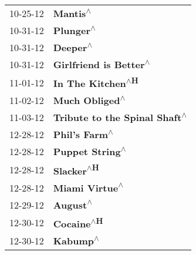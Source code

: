 \begin{supertabular}{p{0.25\columnwidth}p{0.75\columnwidth}}
 10-25-12 &                       \textbf{Mantis\textsuperscript{$\wedge$}} \\
 10-31-12 &                      \textbf{Plunger\textsuperscript{$\wedge$}} \\
 10-31-12 &                       \textbf{Deeper\textsuperscript{$\wedge$}} \\
 10-31-12 &         \textbf{Girlfriend is Better\textsuperscript{$\wedge$}} \\
 11-01-12 &              \textbf{In The Kitchen\textsuperscript{$\wedge$H}} \\
 11-02-12 &                 \textbf{Much Obliged\textsuperscript{$\wedge$}} \\
 11-03-12 &  \textbf{Tribute to the Spinal Shaft\textsuperscript{$\wedge$}} \\
 12-28-12 &                  \textbf{Phil's Farm\textsuperscript{$\wedge$}} \\
 12-28-12 &                \textbf{Puppet String\textsuperscript{$\wedge$}} \\
 12-28-12 &                     \textbf{Slacker\textsuperscript{$\wedge$H}} \\
 12-28-12 &                 \textbf{Miami Virtue\textsuperscript{$\wedge$}} \\
 12-29-12 &                       \textbf{August\textsuperscript{$\wedge$}} \\
 12-30-12 &                     \textbf{Cocaine\textsuperscript{$\wedge$H}} \\
 12-30-12 &                       \textbf{Kabump\textsuperscript{$\wedge$}} \\
\end{supertabular}
